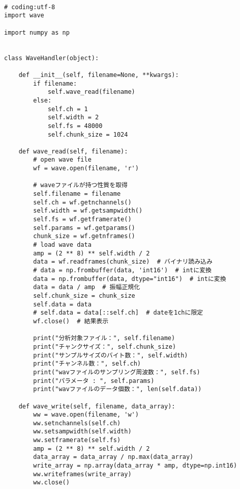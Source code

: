 \begin{lstlisting}[caption=wave\_handler.py,label=wave\_handler.py]

# coding:utf-8
import wave

import numpy as np


class WaveHandler(object):

    def __init__(self, filename=None, **kwargs):
        if filename:
            self.wave_read(filename)
        else:
            self.ch = 1
            self.width = 2
            self.fs = 48000
            self.chunk_size = 1024

    def wave_read(self, filename):
        # open wave file
        wf = wave.open(filename, 'r')

        # waveファイルが持つ性質を取得
        self.filename = filename
        self.ch = wf.getnchannels()
        self.width = wf.getsampwidth()
        self.fs = wf.getframerate()
        self.params = wf.getparams()
        chunk_size = wf.getnframes()
        # load wave data
        amp = (2 ** 8) ** self.width / 2
        data = wf.readframes(chunk_size)  # バイナリ読み込み
        # data = np.frombuffer(data, 'int16')  # intに変換
        data = np.frombuffer(data, dtype="int16")  # intに変換
        data = data / amp  # 振幅正規化
        self.chunk_size = chunk_size
        self.data = data
        # self.data = data[::self.ch]  # dateを1chに限定
        wf.close()  # 結果表示

        print("分析対象ファイル：", self.filename)
        print("チャンクサイズ：", self.chunk_size)
        print("サンプルサイズのバイト数：", self.width)
        print("チャンネル数：", self.ch)
        print("wavファイルのサンプリング周波数：", self.fs)
        print("パラメータ : ", self.params)
        print("wavファイルのデータ個数：", len(self.data))

    def wave_write(self, filename, data_array):
        ww = wave.open(filename, 'w')
        ww.setnchannels(self.ch)
        ww.setsampwidth(self.width)
        ww.setframerate(self.fs)
        amp = (2 ** 8) ** self.width / 2
        data_array = data_array / np.max(data_array)
        write_array = np.array(data_array * amp, dtype=np.int16)
        ww.writeframes(write_array)
        ww.close()
\end{lstlisting}

